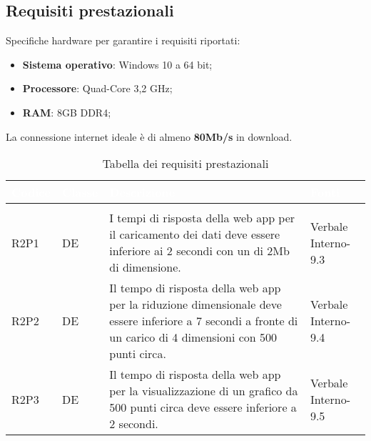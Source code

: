 \subsection{Requisiti prestazionali}


Specifiche hardware per garantire i requisiti riportati:
\begin{itemize}

\item \textbf{Sistema operativo}: Windows 10 a 64 bit;
\item \textbf{Processore}: Quad-Core 3,2 GHz;
\item \textbf{RAM}: 8GB DDR4;

\end{itemize}

La connessione internet ideale è di almeno \textbf{80Mb/s} in download.

\renewcommand{\arraystretch}{1.5}
{
\setlength\arrayrulewidth{1pt}
\begin{longtable}{C{2cm} | C{1.5cm} | C{9cm} | C{3.3cm}}
		\textcolor{white}{\textbf{Codice}} & 
		\textcolor{white}{\textbf{Classe}} & 
		\textcolor{white}{\textbf{Descrizione}} & 
		\textcolor{white}{\textbf{Fonti}} \\
		\endfirsthead
	    \\
	    \endfoot
	    \caption{Tabella dei requisiti prestazionali}
	    \endlastfoot
	    
R2P1 & DE & I tempi di risposta della web app per il caricamento dei dati deve essere inferiore ai 2 secondi con un  di 2Mb di dimensione. & Verbale Interno-9.3\\
R2P2 & DE & Il tempo di risposta della web app per la riduzione dimensionale deve essere inferiore a 7 secondi a fronte di un carico di 4 dimensioni con 500 punti circa. & Verbale Interno-9.4\\
R2P3 & DE & Il tempo di risposta della web app per la visualizzazione di un grafico da 500 punti circa deve essere inferiore a 2 secondi. & Verbale Interno-9.5\\

\end{longtable}
}

